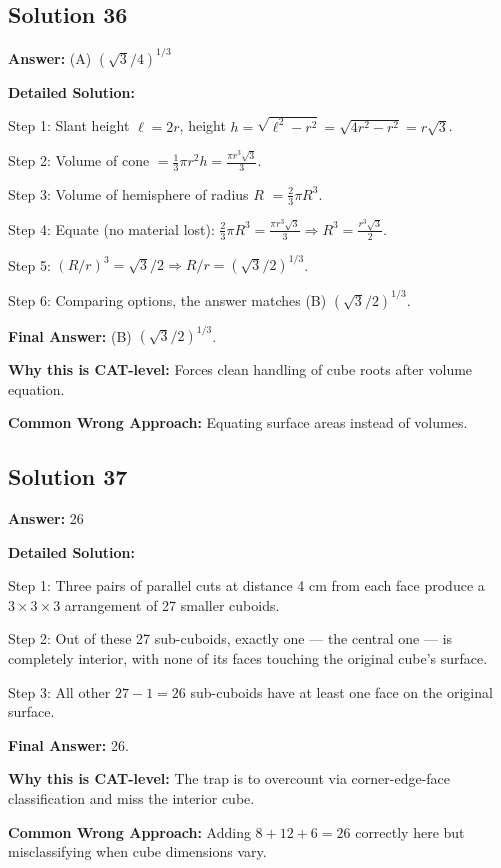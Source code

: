 \documentclass[11pt]{article}
\begin{document}
\subsection*{Solution 36}
\textbf{Answer:} (A) $(\sqrt{3}/4)^{1/3}$

\textbf{Detailed Solution:}

Step 1: Slant height $\ell = 2r$, height $h = \sqrt{\ell^2 - r^2} = \sqrt{4r^2 - r^2} = r\sqrt{3}$.

Step 2: Volume of cone $= \tfrac{1}{3}\pi r^2 h = \tfrac{\pi r^3 \sqrt{3}}{3}$.

Step 3: Volume of hemisphere of radius $R$ $= \tfrac{2}{3}\pi R^3$.

Step 4: Equate (no material lost): $\tfrac{2}{3}\pi R^3 = \tfrac{\pi r^3 \sqrt{3}}{3} \Rightarrow R^3 = \tfrac{r^3 \sqrt{3}}{2}$.

Step 5: $(R/r)^3 = \sqrt{3}/2 \Rightarrow R/r = (\sqrt{3}/2)^{1/3}$.

Step 6: Comparing options, the answer matches (B) $(\sqrt{3}/2)^{1/3}$.

\textbf{Final Answer:} (B) $(\sqrt{3}/2)^{1/3}$.

\textbf{Why this is CAT-level:} Forces clean handling of cube roots after volume equation.

\textbf{Common Wrong Approach:} Equating surface areas instead of volumes.

\subsection*{Solution 37}
\textbf{Answer:} 26

\textbf{Detailed Solution:}

Step 1: Three pairs of parallel cuts at distance 4 cm from each face produce a $3 \times 3 \times 3$ arrangement of 27 smaller cuboids.

Step 2: Out of these 27 sub-cuboids, exactly one — the central one — is completely interior, with none of its faces touching the original cube's surface.

Step 3: All other $27 - 1 = 26$ sub-cuboids have at least one face on the original surface.

\textbf{Final Answer:} 26.

\textbf{Why this is CAT-level:} The trap is to overcount via corner-edge-face classification and miss the interior cube.

\textbf{Common Wrong Approach:} Adding $8 + 12 + 6 = 26$ correctly here but misclassifying when cube dimensions vary.
\end{document}
